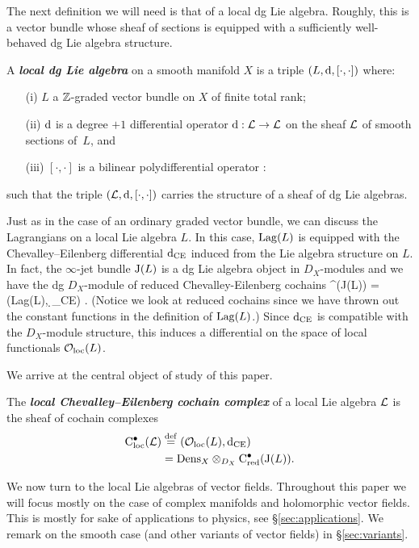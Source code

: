 \documentclass[11pt]{amsart}
\numberwithin{equation}{section}
\def\define{\overset{\rm def}{=}}
\newcommand{\defterm}[1]{\textbf{\emph{#1}}}
\def\jet{{\rm J}}
\begin{document}
The next definition we will need is that of a local dg Lie algebra. 
Roughly, this is a vector bundle whose sheaf of sections is equipped with a sufficiently well-behaved dg Lie algebra structure.

\begin{dfn} 
A \defterm{local dg Lie algebra} on a smooth manifold $X$ is a triple $(L, {\rm d}, [\cdot , \cdot])$ where:
\begin{itemize}
\item[(i)] $L$ a $\mathbb Z$-graded vector bundle on $X$ of finite total rank;
\item[(ii)] ${\rm d}$ is a degree $+1$ differential operator ${\rm d} : \mathcal L \to \mathcal L$ on the sheaf $\mathcal L$ of smooth sections of~$L$, and
\item[(iii)] $[\cdot, \cdot]$ is a bilinear polydifferential operator
\beqn
[\cdot , \cdot] : \cL \times \cL \to \cL
\eeqn
\end{itemize}
such that the triple $(\mathcal L, {\rm d}, [\cdot,\cdot])$ carries the structure of a sheaf of dg Lie algebras. 
\end{dfn}

Just as in the case of an ordinary graded vector bundle, we can discuss the Lagrangians on a local Lie algebra $L$. 
In this case, ${\rm Lag}(L)$ is equipped with the Chevalley--Eilenberg differential ${\rm d}_{\rm CE}$ induced from the Lie algebra structure on $L$. 
In fact, the $\infty$-jet bundle $\jet(L)$ is a dg Lie algebra object in $D_X$-modules and we have the dg $D_X$-module of reduced Chevalley-Eilenberg cochains 
\beqn
\cred^\bu (\jet(L)) = ({\rm Lag}(L), \d_{\rm CE}) . 
\eeqn
(Notice we look at reduced cochains since we have thrown out the constant functions in the definition of ${\rm Lag}(L)$.)
Since ${\rm d}_{\rm CE}$ is compatible with the $D_X$-module structure, this induces a differential on the space of local functionals ${\mathcal O}_{\rm loc}(L)$. 

We arrive at the central object of study of this paper.

\begin{dfn}
The \defterm{local Chevalley--Eilenberg cochain complex} of a local Lie algebra $\mathcal L$ is the sheaf of cochain complexes
\begin{align}
\cloc^\bu(\cL) & \define \left(\oloc(L) , \d_{\rm CE} \right) \\ & = {\rm Dens}_X \otimes_{D_X} \cred^\bu(\jet(L)).
\end{align}
\end{dfn}

We now turn to the local Lie algebras of vector fields. 
Throughout this paper we will focus mostly on the case of complex manifolds and holomorphic vector fields.
This is mostly for sake of applications to physics, see \S \ref{sec:applications}.
We remark on the smooth case (and other variants of vector fields) in \S \ref{sec:variants}. 
\end{document}
